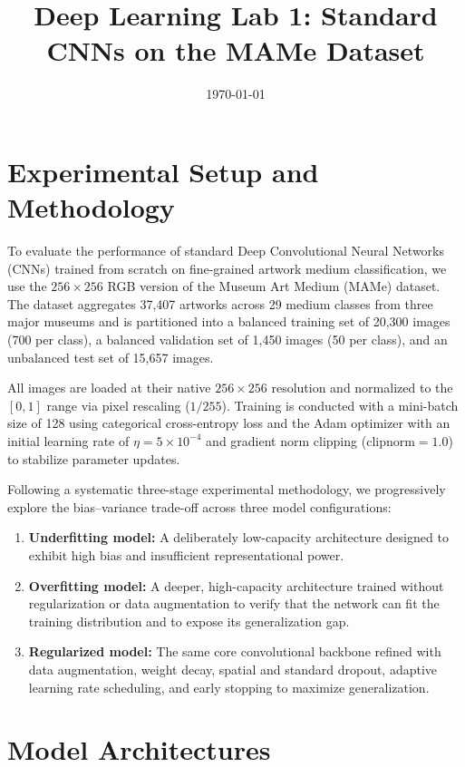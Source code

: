 \documentclass[11pt, a4paper]{article}
\title{Deep Learning Lab 1: Standard CNNs on the MAMe Dataset}
\date{\today}
\begin{document}
\maketitle

\section{Experimental Setup and Methodology}

To evaluate the performance of standard Deep Convolutional Neural Networks (CNNs) trained from scratch on fine-grained artwork medium classification, we use the $256 \times 256$ RGB version of the Museum Art Medium (MAMe) dataset. The dataset aggregates 37,407 artworks across 29 medium classes from three major museums and is partitioned into a balanced training set of 20,300 images (700 per class), a balanced validation set of 1,450 images (50 per class), and an unbalanced test set of 15,657 images.

All images are loaded at their native $256 \times 256$ resolution and normalized to the $[0, 1]$ range via pixel rescaling ($1/255$). Training is conducted with a mini-batch size of 128 using categorical cross-entropy loss and the Adam optimizer with an initial learning rate of $\eta = 5 \times 10^{-4}$ and gradient norm clipping ($\text{clipnorm} = 1.0$) to stabilize parameter updates.

Following a systematic three-stage experimental methodology, we progressively explore the bias--variance trade-off across three model configurations:
\begin{enumerate}
    \item \textbf{Underfitting model:} A deliberately low-capacity architecture designed to exhibit high bias and insufficient representational power.
    \item \textbf{Overfitting model:} A deeper, high-capacity architecture trained without regularization or data augmentation to verify that the network can fit the training distribution and to expose its generalization gap.
    \item \textbf{Regularized model:} The same core convolutional backbone refined with data augmentation, weight decay, spatial and standard dropout, adaptive learning rate scheduling, and early stopping to maximize generalization.
\end{enumerate}

\section{Model Architectures}
\end{document}
